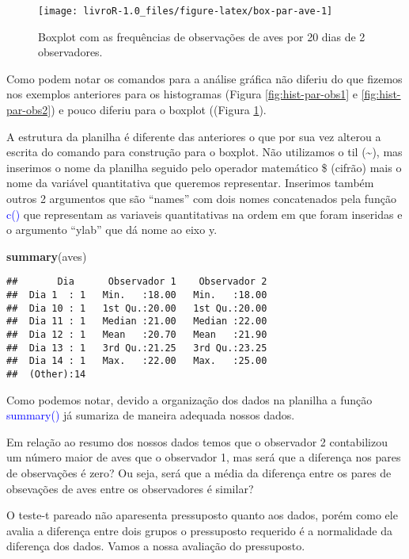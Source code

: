 \documentclass[14pt,titlepage, oneside, openany, a4paper]{book}
\newenvironment{Shaded}{\begin{snugshade}}{\end{snugshade}}
\newcommand{\KeywordTok}[1]{\textcolor[rgb]{0.13,0.29,0.53}{\textbf{#1}}}
\newcommand{\NormalTok}[1]{#1}
\begin{document}
\begin{figure}[H]
\texttt{[image: livroR-1.0\_files/figure-latex/box-par-ave-1]} \caption{Boxplot com as frequências de observações de aves por 20 dias de 2 observadores.}\label{fig:box-par-ave}
\end{figure}

Como podem notar os comandos para a análise gráfica não diferiu do que fizemos nos exemplos anteriores para os histogramas (Figura \ref{fig:hist-par-obs1} e \ref{fig:hist-par-obs2}) e pouco diferiu para o boxplot ((Figura \ref{fig:box-par-ave}).

A estrutura da planilha é diferente das anteriores o que por sua vez alterou a escrita do comando para construção para o boxplot. Não utilizamos o til (\textasciitilde{}), mas inserimos o nome da planilha seguido pelo operador matemático \$ (cifrão) mais o nome da variável quantitativa que queremos representar. Inserimos também outros 2 argumentos que são ``names'' com dois nomes concatenados pela função \textcolor{blue}{c()} que representam as variaveis quantitativas na ordem em que foram inseridas e o argumento ``ylab'' que dá nome ao eixo y.

\begin{Shaded}
\begin{Highlighting}[]
\KeywordTok{summary}\NormalTok{(aves)}
\end{Highlighting}
\end{Shaded}

\begin{verbatim}
##       Dia      Observador 1    Observador 2  
##  Dia 1  : 1   Min.   :18.00   Min.   :18.00  
##  Dia 10 : 1   1st Qu.:20.00   1st Qu.:20.00  
##  Dia 11 : 1   Median :21.00   Median :22.00  
##  Dia 12 : 1   Mean   :20.70   Mean   :21.90  
##  Dia 13 : 1   3rd Qu.:21.25   3rd Qu.:23.25  
##  Dia 14 : 1   Max.   :22.00   Max.   :25.00  
##  (Other):14
\end{verbatim}

Como podemos notar, devido a organização dos dados na planilha a função \textcolor{blue}{summary()} já sumariza de maneira adequada nossos dados.

Em relação ao resumo dos nossos dados temos que o observador 2 contabilizou um número maior de aves que o observador 1, mas será que a diferença nos pares de observações é zero? Ou seja, será que a média da diferença entre os pares de obsevações de aves entre os observadores é similar?

O teste-t pareado não aparesenta pressuposto quanto aos dados, porém como ele avalia a diferença entre dois grupos o pressuposto requerido é a normalidade da diferença dos dados. Vamos a nossa avaliação do pressuposto.
\end{document}
